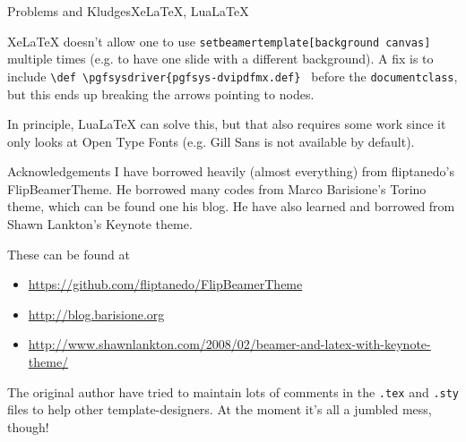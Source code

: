 \begin{frame}[c]{Problems and Kludges}{XeLaTeX, LuaLaTeX}

	XeLaTeX doesn't allow one to use \texttt{setbeamertemplate[background canvas]} multiple times (e.g. to have one slide with a different background). A fix is to include \texttt{\textbackslash def \textbackslash pgfsysdriver\{pgfsys-dvipdfmx.def\} } before the \texttt{documentclass}, but this ends up breaking the arrows pointing to nodes.

	In principle, LuaLaTeX can solve this, but that also requires some work since it only looks at Open Type Fonts (e.g. Gill Sans is not available by default).

\end{frame}



\begin{frame}[t]{Acknowledgements}
	I have borrowed heavily (almost everything) from fliptanedo's FlipBeamerTheme. He borrowed many codes from Marco Barisione's \alert{Torino theme}, which can be found one his blog. He have also learned and borrowed from Shawn Lankton's Keynote theme.

	\vspace{1em}
	These can be found at
	\begin{itemize}
		\item \url{https://github.com/fliptanedo/FlipBeamerTheme}
		\item \url{http://blog.barisione.org}
		\item \footnotesize{\url{http://www.shawnlankton.com/2008/02/beamer-and-latex-with-keynote-theme/}}
	\end{itemize}

	\vspace{1em}
	The original author have tried to maintain lots of comments in the \texttt{.tex} and \texttt{.sty} files to help other template-designers. At the moment it's all a jumbled mess, though!
\end{frame}



